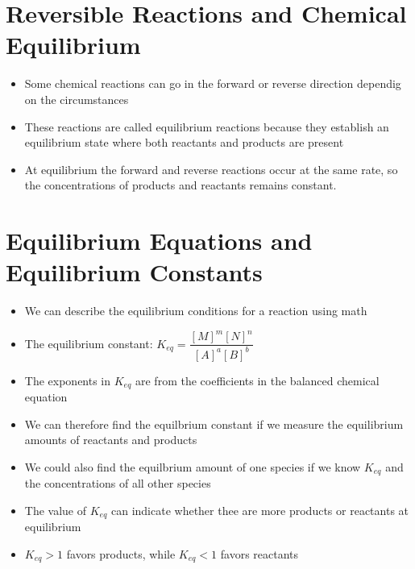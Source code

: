 \documentclass[12pt, openany, letterpaper]{memoir}
\begin{document}
\section{Reversible Reactions and Chemical Equilibrium}
\begin{itemize}
	\item Some chemical reactions can go in the forward or reverse direction dependig on the circumstances
	\item These reactions are called equilibrium reactions because they establish an equilibrium state where both reactants and products are present
	\item At equilibrium the forward and reverse reactions occur at the same rate, so the concentrations of products and reactants remains constant.
\end{itemize}
\section{Equilibrium Equations and Equilibrium Constants}
\begin{itemize}
	\item We can describe the equilibrium conditions for a reaction using math
	\item The equilibrium constant: $K_{eq}=\dfrac{[M]^m[N]^n}{[A]^a[B]^b}$
	\item The exponents in $K_{eq}$ are from the coefficients in the balanced chemical equation
	\item We can therefore find the equilbrium constant if we measure the equilibrium amounts of reactants and products
	\item We could also find the equilbrium amount of one species if we know $K_{eq}$ and the concentrations of all other species
	\item The value of $K_{eq}$ can indicate whether thee are more products or reactants at equilibrium
	\item $K_{eq}>1$ favors products, while $K_{eq}<1$ favors reactants
\end{itemize}
\end{document}
